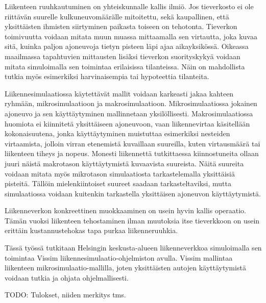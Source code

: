 \documentclass[english, 12pt, a4paper, elec, utf8, pdfa, online]{aaltothesis}
\date{\pubdate}
\begin{document}
\makecoverpage
\makecopyrightpage

\begin{abstractpage}[english]
	\abstracttext{}
\end{abstractpage}

\newpage


\begin{abstractpage}[finnish]
    {\footnotesize
    Liikenteen ruuhkautuminen on yhteiskunnalle kallis ilmiö. Jos tieverkosto ei ole riittävän suurelle kulkuneuvomäärälle mitoitettu, sekä kaupallinen, että yksittäisten ihmisten siirtyminen paikasta toiseen on tehotonta. Tieverkon toimivuutta voidaan mitata muun muassa mittaamalla sen virtautta, joka kuvaa sitä, kuinka paljon ajoneuvoja tietyn pisteen läpi ajaa aikayksikössä. Oikeassa maailmassa tapahtuvien mittausten lisäksi tieverkon suorityskykyä voidaan mitata simuloimalla sen toimintaa erilaisissa tilanteissa. Näin on mahdollista tutkia myös esimerkiksi harvinaisempia tai hypoteettia tilanteita.

    Liikennesimulaatiossa käytettävät mallit voidaan karkeasti jakaa kahteen ryhmään, mikrosimulaatioon ja makrosimulaatioon. Mikrosimulaatiossa jokainen ajoneuvo ja sen käyttäytyminen mallinnetaan yksilöllisesti. Makrosimulaatiossa huomiota ei kiinnitetä yksittäiseen ajoneuvoon, vaan liikennevirtaa käsitellään kokonaisuutena, jonka käyttäytyminen muistuttaa esimerkiksi nesteiden virtaamista, jolloin virran etenemistä kuvaillaan suureilla, kuten virtausmäärä tai liikenteen tiheys ja nopeus. Monesti liikennettä tutkittaessa kiinnostuneita ollaan juuri näistä makrotason käyttäytymistä kuvaavista suureista. Näitä suureita voidaan mitata myös mikrotason simulaatiosta tarkastelemalla yksittäisiä pisteitä. Tällöin mielenkiintoiset suureet saadaan tarkasteltaviksi, mutta simulaatiossa voidaan kuitenkin tarkastella yksittäisen ajoneuvon käyttäytymistä.

    Liikenneverkon konkreettinen muokkaaminen on usein hyvin kallis operaatio. Tämän vuoksi liikenteen tehostaminen ilman muutoksia itse tieverkkoon on usein erittäin kustannustehokas tapa purkaa liikenneruuhkia. 

    Tässä työssä tutkitaan Helsingin keskusta-alueen liikenneverkkoa simuloimalla sen toimintaa Vissim liikennesimulaatio-ohjelmiston avulla. Vissim mallintaa liikenteen mikrosimulaatio-mallilla, joten yksittäisten autojen käyttäytymistä voidaan tutkia ja ohjata ohjelmallisesti.

    TODO: Tulokset, niiden merkitys tms.
    }

\end{abstractpage}
\end{document}
